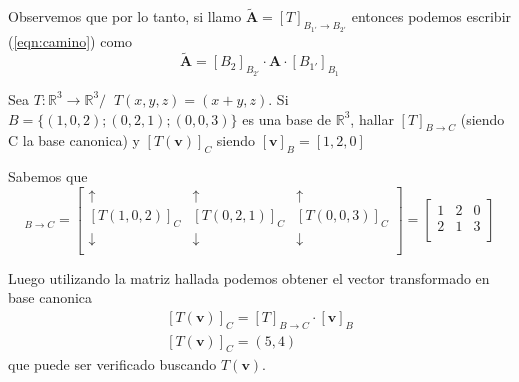 \vspace*{2pt}

Observemos que por lo tanto, si llamo $\bm{\tilde{A}} = [T]_{B_{1'} \rightarrow B_{2'}}$
entonces podemos escribir (\ref*{eqn:camino}) como
\begin{equation}
    \bm{\tilde{A}} = [B_2]_{B_{2'}} \cdot \bm{A} \cdot [B_{1'}]_{B_1} 
\end{equation}

\vspace*{3pt}

\begin{example}
    Sea $T: \mathbb{R}^3 \rightarrow \mathbb{R}^3 / \; \; T(x, y, z) = (x+y, z)$.
    Si $B = \{(1,0,2);(0,2,1);(0,0,3)\}$ es una base de $\mathbb{R}^3$, hallar $[T]_{B \rightarrow C}$ (siendo C la base canonica)
    y $[T( \bm{v})]_C$ siendo $[\bm{v}]_B = [1,2,0]$

    \vspace*{5pt}

    Sabemos que
    \begin{equation*}
        [T]_{B \rightarrow C} = 
        \begin{bmatrix}
            \uparrow & \uparrow &  \uparrow\\
            [T(1,0,2)]_{C} & [T(0,2,1)]_{C} & [T(0,0,3)]_{C}\\
            \downarrow & \downarrow &  \downarrow\\
        \end{bmatrix}
        =
        \begin{bmatrix}
        1 & 2 & 0\\
        2 & 1 & 3\\
        \end{bmatrix}
    \end{equation*} 

    Luego utilizando la matriz hallada podemos obtener el vector transformado en base
    canonica
    \begin{equation*}
        \begin{split}
            [T(\bm{v})]_C = [T]_{B \rightarrow C} \cdot [\bm{v}]_B \\
            [T(\bm{v})]_C = (5, 4) 
        \end{split} 
    \end{equation*}
    que puede ser verificado buscando $T(\bm{v})$.
\end{example}

